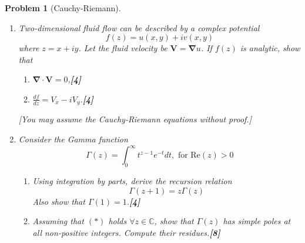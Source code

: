\documentclass[a4paper]{article}
\theoremstyle{new}
\newtheorem{qns}{Problem}[section]
\begin{document}
\begin{qns}[Cauchy-Riemann]\leavevmode
\begin{enumerate}[label=(\roman*)]
\item Two-dimensional fluid flow can be described by a complex potential
$$f(z)=u(x,y)+iv(x,y)$$
where $z=x+iy$. Let the fluid velocity be $\mathbf{V}=\boldsymbol{\nabla}u$. If $f(z)$ is analytic, show that
\begin{enumerate}[label=(\alph*)]
\item  $\boldsymbol{\nabla}\cdot\mathbf{V}=0$,\hfill \textbf{[4]}
\item $\frac{df}{dz}=V_x-iV_y$.\hfill \textbf{[4]}
\end{enumerate}
[You may assume the Cauchy-Riemann equations without proof.]
\item Consider the Gamma function
$$\Gamma(z)=\int_0^\infty t^{z-1}e^{-t}dt, \text{ for }\text{Re}(z)>0$$
\begin{enumerate}[label=(\alph*)]
\item Using integration by parts, derive the recursion relation 
\begin{equation}
    \Gamma(z+1)=z\Gamma(z)\tag{*}
\end{equation}
Also show that $\Gamma(1)=1$.\hfill \textbf{[4]}
\item Assuming that $(*)$ holds $\forall z\in\mathbb{C}$, show that $\Gamma(z)$ has simple poles at all non-positive integers. Compute their residues.\hfill \textbf{[8]}
\end{enumerate}
\end{enumerate}
\end{qns}
\end{document}
